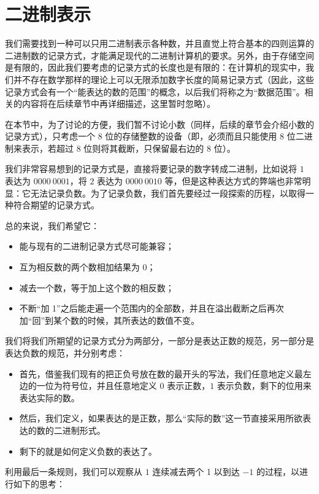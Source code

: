 \section{二进制表示}\label{sec:NumberSystemBasics/BinaryPresentation}
    我们需要找到一种可以只用二进制表示各种数，并且直觉上符合基本的四则运算的二进制数的记录方式，才能满足现代的二进制计算机的要求。另外，由于存储空间是有限的，因此我们要考虑的记录方式的长度也是有限的：在计算机的现实中，我们并不存在数学那样的理论上可以无限添加数字长度的简易记录方式（因此，这些记录方式会有一个“能表达的数的范围”的概念，以后我们将称之为“数据范围”。相关的内容将在后续章节中再详细描述，这里暂时忽略）。

    在本节中，为了讨论的方便，我们暂不讨论小数（同样，后续的章节会介绍小数的记录方式），只考虑一个 $8$ 位的存储整数的设备（即，必须而且只能使用 $8$ 位二进制来表示，若超过 $8$ 位则将其截断，只保留最右边的 $8$ 位）。

    我们非常容易想到的记录方式是，直接将要记录的数字转成二进制，比如说将 $1$ 表达为 $0000\ 0001$，将 $2$ 表达为 $0000\ 0010$ 等，但是这种表达方式的弊端也非常明显：它无法记录负数。为了记录负数，我们首先要经过一段探索的历程，以取得一种符合期望的记录方式。

    总的来说，我们希望它：
    \begin{itemize}
        \item 能与现有的二进制记录方式尽可能兼容；
        \item 互为相反数的两个数相加结果为 $0$；
        \item 减去一个数，等于加上这个数的相反数；
        \item 不断“加 1”之后能走遍一个范围内的全部数，并且在溢出截断之后再次加“回”到某个数的时候，其所表达的数值不变。
    \end{itemize}

    我们将我们所期望的记录方式分为两部分，一部分是表达正数的规范，另一部分是表达负数的规范，并分别考虑：
    \begin{itemize}
        \item 首先，借鉴我们现有的把正负号放在数的最开头的写法，我们任意地定义最左边的一位为符号位，并且任意地定义 $0$ 表示正数，$1$ 表示负数，剩下的位用来表达实际的数。
        \item 然后，我们定义，如果表达的是正数，那么“实际的数”这一节直接采用所欲表达的数的二进制形式。
        \item 剩下的就是如何定义负数的表达了。
    \end{itemize}

    利用最后一条规则，我们可以观察从 $1$ 连续减去两个 1 以到达 $-1$ 的过程，以进行如下的思考：

